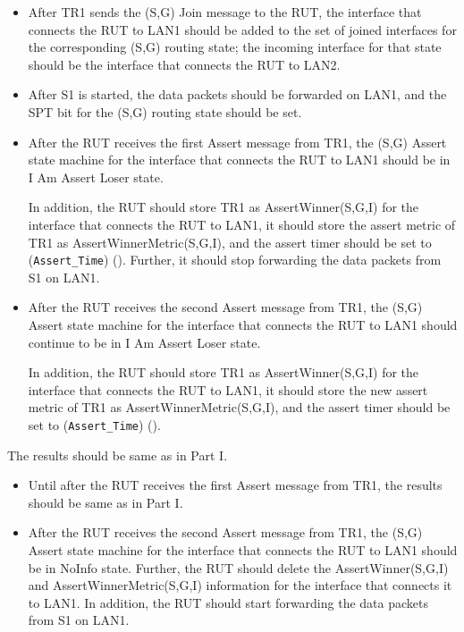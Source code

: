 \documentclass[11pt]{report}
\begin{document}

\begin{itemize}

  \item After TR1 sends the (S,G) Join message to the RUT, the interface that
  connects the RUT to LAN1 should be added to the set of joined interfaces for
  the corresponding (S,G) routing state; the incoming interface for that state
  should be the interface that connects the RUT to LAN2.

  \item After S1 is started, the data packets should be forwarded on LAN1,
  and the SPT bit for the (S,G) routing state should be set.

  \item After the RUT receives the first Assert message from TR1, the (S,G)
  Assert state machine for the interface that connects the RUT to LAN1 should
  be in I Am Assert Loser state.

  In addition, the RUT should store TR1 as AssertWinner(S,G,I) for the
  interface that connects the RUT to LAN1, it should store the assert metric
  of TR1 as AssertWinnerMetric(S,G,I), and the assert timer should be set to
  (\verb=Assert_Time=) ({\PimsmAssertTime}).
  Further, it should stop forwarding the data packets from S1 on LAN1.

  \item After the RUT receives the second Assert message from TR1, the (S,G)
  Assert state machine for the interface that connects the RUT to LAN1 should
  continue to be in I Am Assert Loser state.

  In addition, the RUT should store TR1 as AssertWinner(S,G,I) for the
  interface that connects the RUT to LAN1, it should store the new assert
  metric of TR1 as AssertWinnerMetric(S,G,I), and the assert timer should be
  set to (\verb=Assert_Time=) ({\PimsmAssertTime}).

\end{itemize}


The results should be same as in Part I.


\begin{itemize}

  \item Until after the RUT receives the first Assert message from TR1, the
  results should be same as in Part I.

  \item After the RUT receives the second Assert message from TR1, the (S,G)
  Assert state machine for the interface that connects the RUT to LAN1 should
  be in NoInfo state.
  Further, the RUT should delete the AssertWinner(S,G,I) and
  AssertWinnerMetric(S,G,I) information for the interface that connects it to
  LAN1.
  In addition, the RUT should start forwarding the data packets from S1 on
  LAN1.

\end{itemize}
\end{document}

